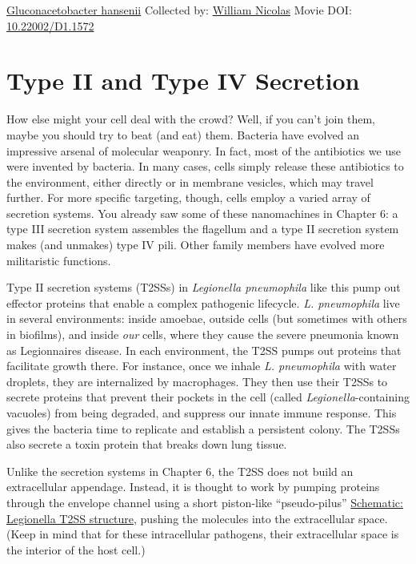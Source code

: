 \documentclass[]{tufte-book}
\begin{document}
\hypertarget{htmlwidget-57f218d782dcae05eac1}{}

\label{fig:9-2}\protect\hyperlink{tree}{Gluconacetobacter hansenii} Collected by: \protect\hyperlink{william_nicolas}{William Nicolas} Movie DOI: \href{https://doi.org/10.22002/D1.1572}{10.22002/D1.1572}

\hypertarget{type-ii-and-type-iv-secretion}{%
\section{Type II and Type IV Secretion}\label{type-ii-and-type-iv-secretion}}

How else might your cell deal with the crowd? Well, if you can't join them, maybe you should try to beat (and eat) them. Bacteria have evolved an impressive arsenal of molecular weaponry. In fact, most of the antibiotics we use were invented by bacteria. In many cases, cells simply release these antibiotics to the environment, either directly or in membrane vesicles, which may travel further. For more specific targeting, though, cells employ a varied array of secretion systems. You already saw some of these nanomachines in Chapter 6: a type III secretion system assembles the flagellum and a type II secretion system makes (and unmakes) type IV pili. Other family members have evolved more militaristic functions.

Type II secretion systems (T2SSs) in \emph{Legionella pneumophila} like this pump out effector proteins that enable a complex pathogenic lifecycle. \emph{L. pneumophila} live in several environments: inside amoebae, outside cells (but sometimes with others in biofilms), and inside \emph{our} cells, where they cause the severe pneumonia known as Legionnaires disease. In each environment, the T2SS pumps out proteins that facilitate growth there. For instance, once we inhale \emph{L. pneumophila} with water droplets, they are internalized by macrophages. They then use their T2SSs to secrete proteins that prevent their pockets in the cell (called \emph{Legionella}-containing vacuoles) from being degraded, and suppress our innate immune response. This gives the bacteria time to replicate and establish a persistent colony. The T2SSs also secrete a toxin protein that breaks down lung tissue.

Unlike the secretion systems in Chapter 6, the T2SS does not build an extracellular appendage. Instead, it is thought to work by pumping proteins through the envelope channel using a short piston-like ``pseudo-pilus'' \protect\hyperlink{Legionella_T2SS_structure}{Schematic: Legionella T2SS structure}, pushing the molecules into the extracellular space. (Keep in mind that for these intracellular pathogens, their extracellular space is the interior of the host cell.)
\end{document}
